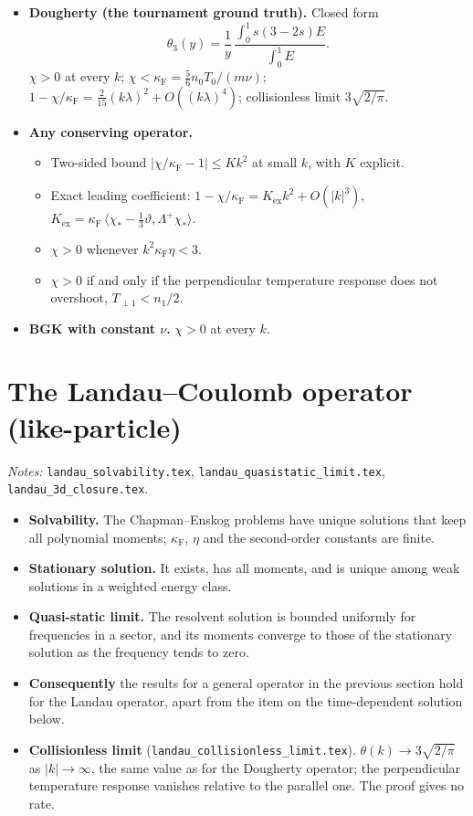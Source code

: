 \documentclass[11pt]{article}
\newcommand{\avg}[1]{\langle #1\rangle}
\begin{document}
\begin{itemize}
  \item \textbf{Dougherty (the tournament ground truth).} Closed form
    \[
      \theta_3(y)=\frac1y\,\frac{\int_0^1s(3-2s)E}{\int_0^1E}.
    \]
    $\chi>0$ at every $k$; $\chi<\kappa_{\mathrm F}=\tfrac56n_0T_0/(m\nu)$;
    $1-\chi/\kappa_{\mathrm F}=\tfrac{2}{15}(k\lambda)^2+O((k\lambda)^4)$;
    collisionless limit $3\sqrt{2/\pi}$.
  \item \textbf{Any conserving operator.}
    \begin{itemize}
      \item Two-sided bound $|\chi/\kappa_{\mathrm F}-1|\le Kk^2$ at small
        $k$, with $K$ explicit.
      \item Exact leading coefficient:
        $1-\chi/\kappa_{\mathrm F}=K_{\mathrm{ex}}k^2+O(|k|^3)$,
        $K_{\mathrm{ex}}=\kappa_{\mathrm F}\,
        \avg{\chi_*-\tfrac13\vartheta,\Lambda^+\chi_*}$.
      \item $\chi>0$ whenever $k^2\kappa_{\mathrm F}\eta<3$.
      \item $\chi>0$ if and only if the perpendicular temperature response
        does not overshoot, $T_{\perp1}<n_1/2$.
    \end{itemize}
  \item \textbf{BGK with constant $\nu$.} $\chi>0$ at every $k$.
\end{itemize}

\section{The Landau--Coulomb operator (like-particle)}

\emph{Notes:} \texttt{landau\_solvability.tex},
\texttt{landau\_quasistatic\_limit.tex}, \texttt{landau\_3d\_closure.tex}.

\begin{itemize}
  \item \textbf{Solvability.} The Chapman--Enskog problems have unique
    solutions that keep all polynomial moments; $\kappa_{\mathrm F}$, $\eta$
    and the second-order constants are finite.
  \item \textbf{Stationary solution.} It exists, has all moments, and is
    unique among weak solutions in a weighted energy class.
  \item \textbf{Quasi-static limit.} The resolvent solution is bounded
    uniformly for frequencies in a sector, and its moments converge to those
    of the stationary solution as the frequency tends to zero.
  \item \textbf{Consequently} the results for a general operator in the
    previous section hold for the Landau operator, apart from the item on
    the time-dependent solution below.
  \item \textbf{Collisionless limit}
    (\texttt{landau\_collisionless\_limit.tex}). $\theta(k)\to3\sqrt{2/\pi}$
    as $|k|\to\infty$, the same value as for the Dougherty operator; the
    perpendicular temperature response vanishes relative to the parallel
    one. The proof gives no rate.
\end{itemize}
\end{document}
